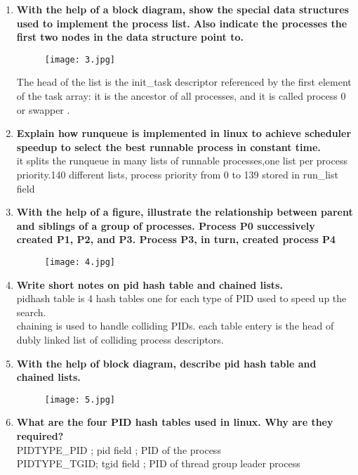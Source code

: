 \documentclass[a4paper,12pt]{article}
\begin{document}
\begin{flushleft}
\begin{enumerate}
{init\_task points to the process descriptor inserted last in the list.;
we will call it the process list.}
\item \textbf{ With the help of a block diagram, show the special data structures used to implement the process list. Also indicate the processes the first two nodes in the data structure point to.\\}
\begin{figure}[H]
 \centering
  \texttt{[image: 3.jpg]}
  \label{fig:3}
\end{figure}
{\color{red}The head of the list is the init\_task descriptor
referenced by the first element of the task array: it is the ancestor of all processes, and it is
called process 0 or swapper .}
\item \textbf{ Explain how runqueue is implemented in linux to achieve scheduler speedup to select the best runnable process in constant time.\\}
{\color{red}it splits the runqueue in many lists of runnable processes,one list per process priority.140 different lists, process priority from 0 to 139 stored in run\_list field}
\item \textbf{ With the help of a figure, illustrate the relationship between parent and siblings of a group of processes. Process P0 successively created P1, P2, and P3. Process P3, in turn, created process P4}
\begin{figure}[H]
 \centering
  \texttt{[image: 4.jpg]}
  \label{fig:4}
\end{figure}
\item \textbf{ Write short notes on pid hash table and chained lists.\\}
{\color{red}pidhash table is 4 hash tables one for each type of PID used to speed up the search.\\chaining is used to handle colliding PIDs. each table entery is the head of dubly linked list of colliding process descriptors.}
\item \textbf{ With the help of block diagram, describe pid hash table and chained lists.}
\begin{figure}[H]
 \centering
  \texttt{[image: 5.jpg]}
  \label{fig:5}
\end{figure}
\item \textbf{ What are the four PID hash tables used in linux. Why are they required?\\}
{\color{red}PIDTYPE\_PID ; pid field ; PID of the process\\
PIDTYPE\_TGID; tgid field ; PID of thread group leader process\\
}
\end{enumerate}
\end{flushleft}
\end{document}
